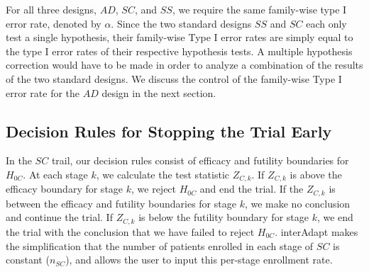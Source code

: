 \documentclass{article}
\newcommand{\interAdapt}{\textsf{interAdapt }}
\begin{document}
For all three designs, $AD$, $SC$, and $SS$, we require the same family-wise type I error rate, denoted by $α$. Since the two standard designs $SS$ and $SC$ each only test a single hypothesis, their family-wise Type I error rates are simply equal to the type I error rates of their respective hypothesis tests. A multiple hypothesis correction would have to be made in order to analyze a combination of the results of the two standard designs. We discuss the control of the family-wise Type I error rate for the $AD$ design in the next section.




\subsection*{Decision Rules for Stopping the Trial Early}

In the $SC$ trail, our decision rules consist of efficacy and futility boundaries for $H_{0C}$. At each stage $k$, we calculate the test statistic $Z_{C,k}$. If $Z_{C,k}$ is above the efficacy boundary for stage $k$, we reject $H_{0C}$ and end the trial. If the $Z_{C,k}$ is between the efficacy and futility boundaries for stage $k$, we make no conclusion and continue the trial. If $Z_{C,k}$ is below the futility boundary for stage $k$, we end the trial with the conclusion that we have failed to reject $H_{0C}$. \interAdapt makes the simplification that the number of patients enrolled in each stage of $SC$ is constant ($n_{SC}$), and allows the user to input this per-stage enrollment rate.
\end{document}
